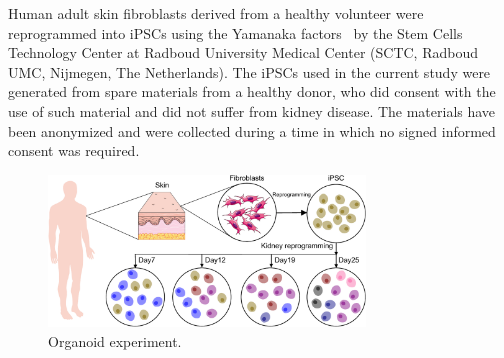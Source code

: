Human adult skin fibroblasts derived from a healthy volunteer were reprogrammed into iPSCs using the Yamanaka factors~\citep{takahashi2006induction} by the Stem Cells Technology Center at Radboud University Medical Center (SCTC, Radboud UMC, Nijmegen, The Netherlands). The iPSCs used in the current study were generated from spare materials from a healthy donor, who did consent with the use of such material and did not suffer from kidney disease. The materials have been anonymized and were collected during a time in which no signed informed consent was required.

\begin{figure}[!ht]
	\centering
	\includegraphics[width=0.75\textwidth]{Organoid_exp/fig}
	\vspace{0.1cm}
	\caption[Organoid experiment]{Organoid experiment.}
	\label{fig:organoid_exp}
\end{figure}

